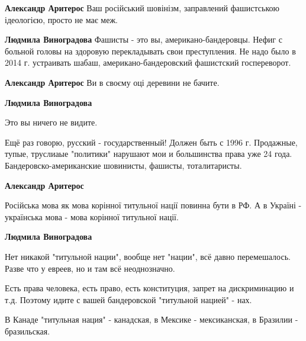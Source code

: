 \begin{itemize}
\begin{itemize}

\textbf{Александр Аритерос} Ваш російський шовінізм, заправлений фашистською ідеологією, просто не має меж.


\textbf{Людмила Виноградова} Фашисты - это вы, американо-бандеровцы.
Нефиг с больной головы на здоровую перекладывать свои преступления.
Не надо было в 2014 г. устраивать шабаш, американо-бандеровский фашистский госпереворот.


\textbf{Александр Аритерос} Ви в своєму оці деревини не бачите.


\textbf{Людмила Виноградова} 

Это вы ничего не видите.

Ещё раз говорю, русский - государственный! Должен быть с 1996 г. Продажные,
тупые, труслиаые "политики" нарушают мои и большинства права уже 24 года.
Бандеровско-американские шовинисты, фашисты, тоталитаристы.




\textbf{Александр Аритерос} 

Російська мова як мова корінної титульної нації повинна бути в РФ. А в Україні
- українська мова - мова корінної титульної нації.



\textbf{Людмила Виноградова} 

Нет никакой "титульной нации", вообще нет "нации", всё давно перемешалось.
Разве что у евреев, но и там всё неоднозначно.

Есть права человека, есть право, есть конституция, запрет на дискриминацию и
т.д. Поэтому идите с вашей бандеровской "титульной нацией" - нах.

В Канаде "титульная нация" - канадская, в Мексике - мексиканская, в Бразилии -
бразильская.


\end{itemize}
\end{itemize}
